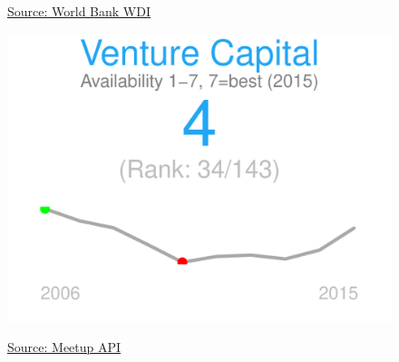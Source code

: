 \documentclass{article}\usepackage[]{graphicx}\usepackage[]{color}
\makeatletter
\def\maxwidth{ %
  \ifdim\Gin@nat@width>\linewidth
    \linewidth
  \else
    \Gin@nat@width
  \fi
}
\makeatother
\begin{document}
\begin{figure}
\begin{minipage}[t]{0.99\textwidth}
\begin{minipage}[t]{0.50\textwidth}
\begin{minipage}[c]{0.29\textwidth}
{}



    \hspace{2ex}\tiny{\href{http://data.worldbank.org}{\textcolor[HTML]{22A6F5}{Source: World Bank WDI}}}
    \end{minipage}
    \begin{minipage}[c]{0.29\textwidth}


{\centering \includegraphics[width=\maxwidth]{figure/figure_sparkline6-1} 

}



    \hspace{2ex}\tiny{\href{http://www.meetup.com/en-US/meetup_api/}{\textcolor[HTML]{22A6F5}{Source: Meetup API}}}
    \end{minipage}
  \end{minipage}
\end{minipage}
\end{figure}

\end{document}
